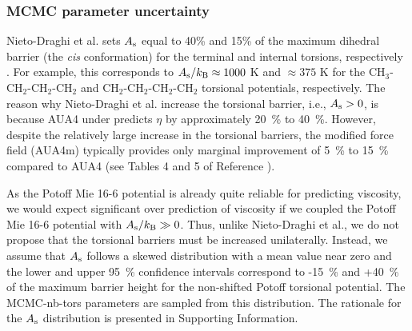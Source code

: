 \documentclass[preprint,review,12pt]{elsarticle}
\begin{document}
    \subsubsection{MCMC parameter uncertainty} \label{sec:parameter_uncertainty}

	Nieto-Draghi et al. sets $A_{\rm s}$ equal to 40\% and 15\% of the maximum dihedral barrier (the \textit{cis} conformation) for the terminal and internal torsions, respectively \cite{Nieto2006,Nieto2008}. For example, this corresponds to $A_{\rm s}/k_{\rm B} \approx 1000$ K and $\approx 375$ K for the CH$_3$-CH$_2$-CH$_2$-CH$_2$ and CH$_2$-CH$_2$-CH$_2$-CH$_2$ torsional potentials, respectively. The reason why Nieto-Draghi et al. increase the torsional barrier, i.e., $A_{\rm s} > 0$, is because AUA4 under predicts $\eta$ by approximately 20~\% to 40~\%. However, despite the relatively large increase in the torsional barriers, the modified force field (AUA4m) typically provides only marginal improvement of 5~\% to 15~\% compared to AUA4 (see Tables 4 and 5 of Reference ). 
	
	
	
	
	As the Potoff Mie 16-6 potential is already quite reliable for predicting viscosity, we would expect significant over prediction of viscosity if we coupled the Potoff Mie 16-6 potential with $A_{\rm s}/k_{\rm B} \gg 0 $. Thus, unlike Nieto-Draghi et al., we do not propose that the torsional barriers must be increased unilaterally. Instead, we assume that $A_{\rm s}$ follows a skewed distribution with a mean value near zero and the lower and upper 95~\% confidence intervals correspond to -15~\% and +40~\% of the maximum barrier height for the non-shifted Potoff torsional potential. The MCMC-nb-tors parameters are sampled from this distribution. The rationale for the $A_{\rm s}$ distribution is presented in Supporting Information. 
	
\end{document}
